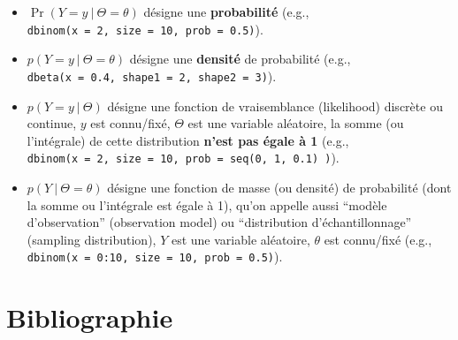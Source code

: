\documentclass[
  a4paper,11pt,twoside,onecolumn,openright,final,oldfontcommands]{memoir}
\providecommand{\tightlist}{%
  \setlength{\itemsep}{0pt}\setlength{\parskip}{0pt}}
\theoremstyle{definition}
\theoremstyle{definition}
\theoremstyle{definition}
\theoremstyle{definition}
\theoremstyle{remark}
\begin{document}
\begin{itemize}
\tightlist
\item
  \(\Pr(Y = y \:\vert\:\Theta = \theta)\) désigne une \textbf{probabilité} (e.g., \texttt{dbinom(x\ =\ 2,\ size\ =\ 10,\ prob\ =\ 0.5)}).
\item
  \(p(Y = y \:\vert\:\Theta = \theta)\) désigne une \textbf{densité} de probabilité (e.g., \texttt{dbeta(x\ =\ 0.4,\ shape1\ =\ 2,\ shape2\ =\ 3)}).
\item
  \(p(Y = y \:\vert\:\Theta)\) désigne une fonction de vraisemblance (likelihood) discrète ou continue, \(y\) est connu/fixé, \(\Theta\) est une variable aléatoire, la somme (ou l'intégrale) de cette distribution \textbf{n'est pas égale à 1} (e.g., \texttt{dbinom(x\ =\ 2,\ size\ =\ 10,\ prob\ =\ seq(0,\ 1,\ 0.1)\ )}).
\item
  \(p(Y \:\vert\:\Theta = \theta)\) désigne une fonction de masse (ou densité) de probabilité (dont la somme ou l'intégrale est égale à 1), qu'on appelle aussi ``modèle d'observation'' (observation model) ou ``distribution d'échantillonnage'' (sampling distribution), \(Y\) est une variable aléatoire, \(\theta\) est connu/fixé (e.g., \texttt{dbinom(x\ =\ 0:10,\ size\ =\ 10,\ prob\ =\ 0.5)}).
\end{itemize}

\hypertarget{bibliographie}{%
\chapter*{Bibliographie}\label{bibliographie}}


\setlength{\parindent}{-0.5in}
\setlength{\parskip}{8pt}
\end{document}
